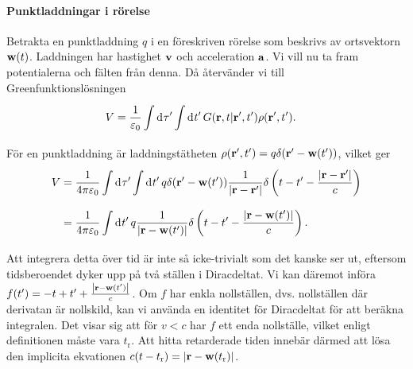 \paragraph{Punktladdningar i rörelse}
Betrakta en punktladdning $q$ i en föreskriven rörelse som beskrivs av ortsvektorn $\vb{w}(t)$. Laddningen har hastighet $\vb{v}$ och acceleration $\vb{a}$. Vi vill nu ta fram potentialerna och fälten från denna. Då återvänder vi till Greenfunktionslösningen
\begin{align*}
	V &= \frac{1}{\varepsilon_{0}}\int\limits_{}^{}\dd[]{\tau'}\int\limits_{}^{}\dd[]{t'}G(\vb{r}, t | \vb{r}', t')\rho(\vb{r}', t').
\end{align*}
För en punktladdning är laddningstätheten $\rho(\vb{r}', t') = q\delta(\vb{r}' - \vb{w}(t'))$, vilket ger
\begin{align*}
	V &= \frac{1}{4\pi\varepsilon_{0}}\int\limits_{}^{}\dd[]{\tau'}\int\limits_{}^{}\dd[]{t'}q\delta(\vb{r}' - \vb{w}(t'))\frac{1}{\abs{\vb{r} - \vb{r}'}}\delta\left(t - t' - \frac{\abs{\vb{r} - \vb{r}'}}{c}\right) \\
	  &= \frac{1}{4\pi\varepsilon_{0}}\int\limits_{}^{}\dd[]{t'}q\frac{1}{\abs{\vb{r} - \vb{w}(t')}}\delta\left(t - t' - \frac{\abs{\vb{r} - \vb{w}(t')}}{c}\right).
\end{align*}
Att integrera detta över tid är inte så icke-trivialt som det kanske ser ut, eftersom tidsberoendet dyker upp på två ställen i Diracdeltat. Vi kan däremot införa $f(t') = - t + t' + \frac{\abs{\vb{r} - \vb{w}(t')}}{c}$. Om $f$ har enkla nollställen, dvs. nollställen där derivatan är nollskild, kan vi använda en identitet för Diracdeltat för att beräkna integralen. Det visar sig att för $v < c$ har $f$ ett enda nollställe, vilket enligt definitionen måste vara $t_{\text{r}}$. Att hitta retarderade tiden innebär därmed att lösa den implicita ekvationen $c(t - t_{\text{r}}) = \abs{\vb{r} - \vb{w}(t_{\text{r}})}$.


